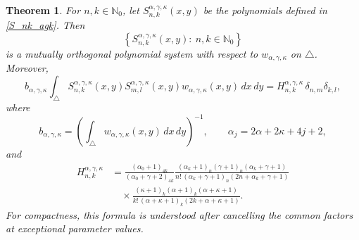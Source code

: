 \documentclass[reqno,10pt]{amsart}
\theoremstyle{plain}
\newtheorem{theorem}{Theorem}[section]
\numberwithin{equation}{section}
\numberwithin{figure}{section}
\begin{document}
\begin{theorem}\label{th:S_nk_orthogonal}
For $n,k\in\mathbb{N}_0$, let
$S_{n,k}^{\alpha,\gamma,\kappa}(x,y)$ be the polynomials defined in
\eqref{S_nk_agk}. Then
\[
\left\{
S_{n,k}^{\alpha,\gamma,\kappa}(x,y):\ n,k\in\mathbb{N}_0
\right\}
\]
is a mutually orthogonal polynomial system with respect to
$w_{\alpha,\gamma,\kappa}$ on $\triangle$. Moreover,
\[
b_{\alpha,\gamma,\kappa}
\int_{\triangle}
S_{n,k}^{\alpha,\gamma,\kappa}(x,y)
S_{m,l}^{\alpha,\gamma,\kappa}(x,y)
w_{\alpha,\gamma,\kappa}(x,y)\,dx\,dy
=
H_{n,k}^{\alpha,\gamma,\kappa}\,
\delta_{n,m}\delta_{k,l},
\]
where
\[
b_{\alpha,\gamma,\kappa}
=
\left(
\int_{\triangle}
w_{\alpha,\gamma,\kappa}(x,y)\,dx\,dy
\right)^{-1},
\qquad
\alpha_j=2\alpha+2\kappa+4j+2,
\]
and
\begin{align*}
H_{n,k}^{\alpha,\gamma,\kappa}
&=
\frac{(\alpha_0+1)_{4k}}
{(\alpha_0+\gamma+2)_{4k}}
\frac{
(\alpha_k+1)_n(\gamma+1)_n(\alpha_k+\gamma+1)
}{
n!\,(\alpha_k+\gamma+1)_n(2n+\alpha_k+\gamma+1)
}
\\[5pt]
&\quad\times
\frac{
(\kappa+1)_k(\alpha+1)_k(\alpha+\kappa+1)
}{
k!\,(\alpha+\kappa+1)_k(2k+\alpha+\kappa+1)
}.
\end{align*}
For compactness, this formula is understood after cancelling the common
factors at exceptional parameter values.
\end{theorem}
\end{document}
